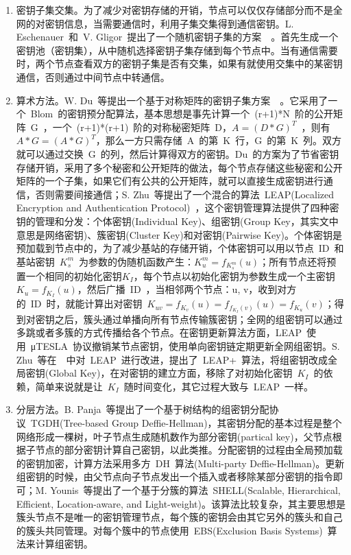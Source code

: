 \documentclass[a4paper,10pt]{article}
\begin{document}
\begin{enumerate}

\item 密钥子集交集。为了减少对密钥存储的开销，节点可以仅仅存储部分而不是全网的对密钥信息，当需要通信时，利用子集交集得到通信密钥。L. Eschenauer~和~V. Gligor~提出了一个随机密钥子集的方案~\cite{Eschenauer2002}~。首先生成一个密钥池（密钥集），从中随机选择密钥子集存储到每个节点中。当有通信需要时，两个节点查看双方的密钥子集是否有交集，如果有就使用交集中的某密钥通信，否则通过中间节点中转通信。

\item 算术方法。W. Du~等提出一个基于对称矩阵的密钥子集方案~\cite{Du2003, Du2005}~。它采用了一个~Blom~的密钥预分配算法，基本思想是事先计算一个~(r+1)*N~阶的公开矩阵~G~，一个~(r+1)*(r+1)~阶的对称秘密矩阵~D，$A=(D*G)^T$~，则有~$A*G=(A*G)^T$，那么一方只需存储~A~的第~K~行，G~的第~K~列。双方就可以通过交换~G~的列，然后计算得双方的密钥。Du~的方案为了节省密钥存储开销，采用了多个秘密和公开矩阵的做法，每个节点存储这些秘密和公开矩阵的一个子集，如果它们有公共的公开矩阵，就可以直接生成密钥进行通信，否则需要间接通信；S. Zhu~等提出了一个混合的算法~LEAP(Localized Encryption and Authentication Protocol)\cite{Zhu2003}~，这个密钥管理算法提供了四种密钥的管理和分发：个体密钥(Individual Key)、组密钥(Group Key，其实文中意思是网络密钥)、簇密钥(Cluster Key)和对密钥(Pairwise Key)。个体密钥是预加载到节点中的，为了减少基站的存储开销，个体密钥可以用以节点~ID~和基站密钥~$K^m_s$~为参数的伪随机函数产生：$K^m_u=f_{K^m_s}(u)$；所有节点还将预置一个相同的初始化密钥$K_I$，每个节点以初始化密钥为参数生成一个主密钥$K_u=f_{K_I}(u)$，然后广播~ID~，当相邻两个节点：u, v，收到对方的~ID~时，就能计算出对密钥~$K_{uv}=f_{K_v}(u)=f_{f_{K_I}(v)}(u)=f_{K_u}(v)$；得到对密钥之后，簇头通过单播向所有节点传输簇密钥；全网的组密钥可以通过多跳或者多簇的方式传播给各个节点。在密钥更新算法方面，LEAP~使用~μTESLA~协议撤销某节点密钥，使用单向密钥链定期更新全网组密钥。S. Zhu~等在~\cite{Zhu2006}~中对~LEAP~进行改进，提出了~LEAP+~算法，将组密钥改成全局密钥(Global Key)，在对密钥的建立方面，移除了对初始化密钥~$K_I$~的依赖，简单来说就是让~$K_I$~随时间变化，其它过程大致与~LEAP~一样。

\item 分层方法。B. Panja~等提出了一个基于树结构的组密钥分配协议~TGDH(Tree-based Group Deffie-Hellman)，其密钥分配的基本过程是整个网络形成一棵树，叶子节点生成随机数作为部分密钥(partical key)，父节点根据子节点的部分密钥计算自己密钥，以此类推。分配密钥的过程由全局预加载的密钥加密，计算方法采用多方~DH~算法(Multi-party Deffie-Hellman)。更新组密钥的时候，由父节点向子节点发出一个插入或者移除某部分密钥的指令即可；M. Younis~等提出了一个基于分簇的算法~SHELL(Scalable, Hierarchical, Efficient, Location-aware, and Light-weight)\cite{Younis2006}。该算法比较复杂，其主要思想是簇头节点不是唯一的密钥管理节点，每个簇的密钥会由其它另外的簇头和自己的簇头共同管理。对每个簇中的节点使用~EBS(Exclusion Basis Systems)~算法来计算组密钥。

\end{enumerate}
\end{document}

